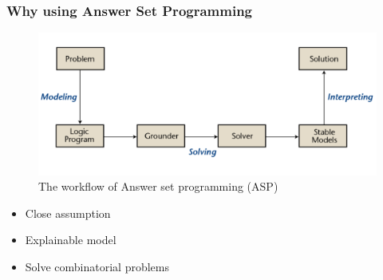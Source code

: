 \documentclass[8pt]{beamer}
\begin{document}
\begin{frame}
\frametitle{Why using Answer Set Programming}
\centering
\begin{figure}[h]
\includegraphics[width=\textwidth]{figures/asp}
\caption{The workflow of Answer set programming (ASP) \tiny \citep{Kaufmann2016GroundingAS}}
\end{figure}
\begin{block}{}
\begin{itemize}
\item Close assumption
\item Explainable model
\item Solve combinatorial problems
\end{itemize}

\end{block}
\end{frame}
\end{document}

